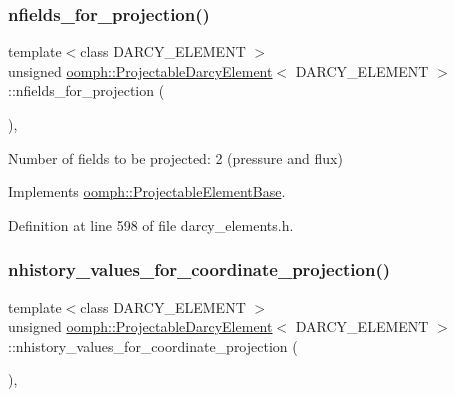 \mbox{\label{classoomph_1_1ProjectableDarcyElement_ae6daf28fea08e70d77bcdcb5426b0fb9}} 
\subsubsection{\texorpdfstring{nfields\+\_\+for\+\_\+projection()}{nfields\_for\_projection()}}
{\footnotesize\ttfamily template$<$class D\+A\+R\+C\+Y\+\_\+\+E\+L\+E\+M\+E\+NT $>$ \\
unsigned \hyperlink{classoomph_1_1ProjectableDarcyElement}{oomph\+::\+Projectable\+Darcy\+Element}$<$ D\+A\+R\+C\+Y\+\_\+\+E\+L\+E\+M\+E\+NT $>$\+::nfields\+\_\+for\+\_\+projection (\begin{DoxyParamCaption}{ }\end{DoxyParamCaption})\hspace{0.3cm}{\ttfamily [inline]}, {\ttfamily [virtual]}}



Number of fields to be projected\+: 2 (pressure and flux) 



Implements \hyperlink{classoomph_1_1ProjectableElementBase_a44634aa4049332a580d249c25564638c}{oomph\+::\+Projectable\+Element\+Base}.



Definition at line 598 of file darcy\+\_\+elements.\+h.

\mbox{\label{classoomph_1_1ProjectableDarcyElement_a32091c680d7793baed0e5294c6143418}} 
\subsubsection{\texorpdfstring{nhistory\+\_\+values\+\_\+for\+\_\+coordinate\+\_\+projection()}{nhistory\_values\_for\_coordinate\_projection()}}
{\footnotesize\ttfamily template$<$class D\+A\+R\+C\+Y\+\_\+\+E\+L\+E\+M\+E\+NT $>$ \\
unsigned \hyperlink{classoomph_1_1ProjectableDarcyElement}{oomph\+::\+Projectable\+Darcy\+Element}$<$ D\+A\+R\+C\+Y\+\_\+\+E\+L\+E\+M\+E\+NT $>$\+::nhistory\+\_\+values\+\_\+for\+\_\+coordinate\+\_\+projection (\begin{DoxyParamCaption}{ }\end{DoxyParamCaption})\hspace{0.3cm}{\ttfamily [inline]}, {\ttfamily [virtual]}}



